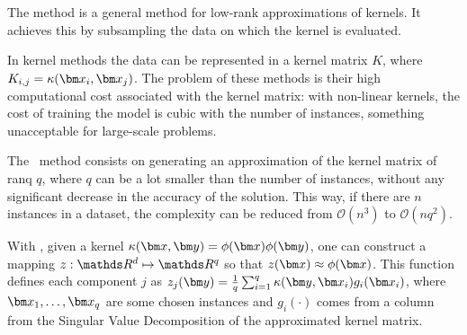 \section{\Nys}

\begin{pre-delivery}
  The \Nys\cite{NIPS2000_1866} method is a general method for low-rank approximations of
  kernels. It achieves this by subsampling the data on which the kernel
  is evaluated.

  In kernel methods the data can be represented in a kernel matrix $K$, where
  $K_{i,j} = \kernel(\vx_i, \vx_j)$. The problem of these methods is their
  high computational cost associated with the kernel matrix: with non-linear
  kernels, the cost of training the model is cubic with the number of
  instances, something unacceptable for large-scale problems.

  The \Nys\ method consists on generating an approximation of the kernel matrix of
  ranq $q$, where $q$ can be a lot smaller than the number of instances, without
  any significant decrease in the accuracy of the solution. This way, if there
  are $n$ instances in a dataset, the complexity can be reduced from
  $\mathcal{O}(n^3)$ to $\mathcal{O}(nq^2)$.

  With \Nys, given a kernel $\kernel(\vx, \vy) = \phi(\vx)\phi(\vy)$, one can
  construct a mapping $z: \reals^d \mapsto \reals^q$ so that
  $z(\vx) \approx \phi(\vx)$. This function defines each component $j$ as
  $z_j(\vy) = \frac{1}{q}\sum_{i = 1}^q \kernel(\vy, \vx_i)g_i(\vx_i)$,
  where $\vx_1, \ldots, \vx_q$ are some chosen instances and
  $g_i(\cdot)$ comes from a column from the Singular Value Decomposition
  of the approximated kernel matrix.
\end{pre-delivery}
